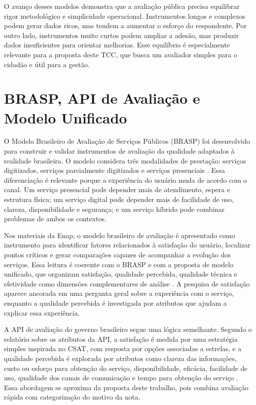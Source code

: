 O avanço desses modelos demonstra que a avaliação pública precisa equilibrar
rigor metodológico e simplicidade operacional. Instrumentos longos e complexos
podem gerar dados ricos, mas tendem a aumentar o esforço do respondente. Por
outro lado, instrumentos muito curtos podem ampliar a adesão, mas produzir dados
insuficientes para orientar melhorias. Esse equilíbrio é especialmente relevante
para a proposta deste TCC, que busca um avaliador simples para o cidadão e útil
para a gestão.

\section{BRASP, API de Avaliação e Modelo Unificado}

O Modelo Brasileiro de Avaliação de Serviços Públicos (BRASP) foi desenvolvido
para construir e validar instrumentos de avaliação da qualidade adaptados à
realidade brasileira. O modelo considera três modalidades de prestação:
serviços digitizados, serviços parcialmente digitizados e serviços presenciais
\cite{silva2019brasp}. Essa diferenciação é relevante porque a experiência do
usuário muda de acordo com o canal. Um serviço presencial pode depender mais de
atendimento, espera e estrutura física; um serviço digital pode depender mais de
facilidade de uso, clareza, disponibilidade e segurança; e um serviço híbrido
pode combinar problemas de ambos os contextos.

Nos materiais da Enap, o modelo brasileiro de avaliação é apresentado como
instrumento para identificar fatores relacionados à satisfação do usuário,
localizar pontos críticos e gerar comparações capazes de acompanhar a evolução
dos serviços. Essa leitura é coerente com o BRASP e com a proposta de modelo
unificado, que organizam satisfação, qualidade percebida, qualidade técnica e
efetividade como dimensões complementares de análise
\cite{limaPereira2020modulo3,silva2019brasp,silva2022modeloUnificado}. A
pesquisa de satisfação aparece ancorada em uma pergunta geral sobre a
experiência com o serviço, enquanto a qualidade percebida é investigada por
atributos que ajudam a explicar essa experiência.

A API de avaliação do governo brasileiro segue uma lógica semelhante. Segundo o
relatório sobre os atributos da API, a satisfação é medida por uma estratégia
simples inspirada no CSAT, com resposta por opções associadas a estrelas, e a
qualidade percebida é explorada por atributos como clareza das informações,
custo ou esforço para obtenção do serviço, disponibilidade, eficácia, facilidade
de uso, qualidade dos canais de comunicação e tempo para obtenção do serviço
\cite{silva2024atributosApi}. Essa abordagem se aproxima da proposta deste
trabalho, pois combina avaliação rápida com categorização do motivo da nota.

